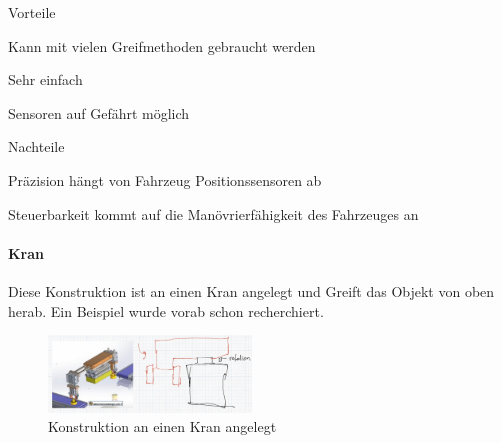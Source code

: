\documentclass[../main.tex]{subfiles}
\begin{document}
\begin{minipage}[t]{0.48\textwidth}
    \begin{items}
          \item [Vorteile]
          \item Kann mit vielen Greifmethoden gebraucht werden
          \item Sehr einfach
          \item Sensoren auf Gefährt möglich
    \end{items}
\end{minipage}
\hfill
\begin{minipage}[t]{0.48\textwidth}
    \begin{items}
          \item [Nachteile]
          \item Präzision hängt von Fahrzeug Positionssensoren ab
          \item Steuerbarkeit kommt auf die Manövrierfähigkeit des Fahrzeuges an 
    \end{items}
\end{minipage}
\newpage
\paragraph{Kran}
Diese Konstruktion ist an einen Kran angelegt und Greift das Objekt von oben herab. Ein Beispiel wurde vorab schon recherchiert.

\begin{figure}
        \centering
        \includegraphics[width=0.48\textwidth]{img/technologierecherche/Rotation/seitlich_mit_rotation.jpg}
        \caption[Konstruktion an einen Kran angelegt]{Konstruktion an einen Kran angelegt \footnotemark} 
        \label{img:tech_seitlich_mit_rotation}
\end{figure}
\end{document}
